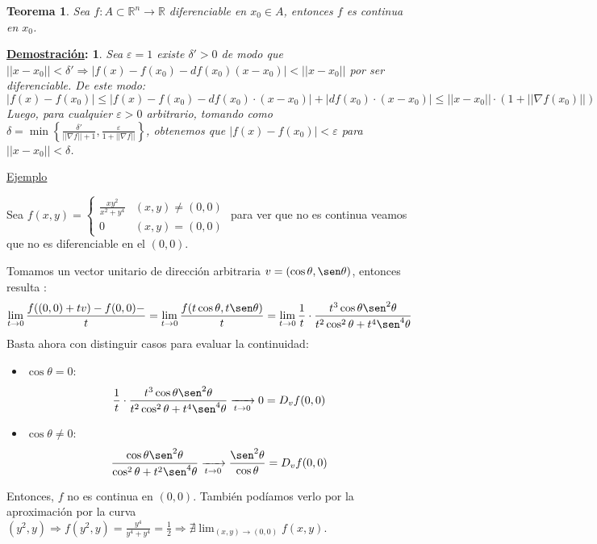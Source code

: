 \documentclass[10pt,a4paper,openright]{book}
\theoremstyle{break}
\newtheorem*{theo}{Teorema}
\newtheorem*{demo}{\underline{Demostración}:}
\begin{document}
\begin{theo}
Sea $f: A \subset \mathbb{R}^n \to \mathbb{R}$ diferenciable en $x_0 \in A$, entonces $f$ es continua en $x_0$.
\end{theo}
\begin{demo}
Sea $\varepsilon = 1$ existe $\delta' > 0$ de modo que $|| x - x_0 || < \delta' \Rightarrow |f(x) - f(x_0) - d f(x_0) (x - x_0)| < || x - x_0 ||$ por ser diferenciable. De este modo:
$$|f(x) - f(x_0)| \leq |f(x) - f(x_0) - df(x_0)\cdot (x - x_0)| + |df(x_0) \cdot (x - x_0)| \leq ||x-x_0|| \cdot (1 + || \nabla f(x_0) ||)$$
Luego, para cualquier $\varepsilon > 0$ arbitrario, tomando como $\delta = \min\left\lbrace \frac{\delta'}{||\nabla f || + 1}, \frac{\varepsilon}{1 + || \nabla f||}\right\rbrace$, obtenemos que $|f(x) - f(x_0)| < \varepsilon$ para $||x - x_0|| < \delta$.
\end{demo}

\underline{Ejemplo}

Sea $f(x,y) = \begin{cases} \frac{xy^2}{x^2 + y^4} & (x,y) \neq (0,0) \\ 0 & (x,y) = (0,0) \end{cases}$ para ver que no es continua veamos que no es diferenciable en el $(0,0)$.

Tomamos un vector unitario de dirección arbitraria $v = (\cos\theta , \sen\theta)$, entonces resulta :
$$\lim_{t\rightarrow 0}\frac{f((0,0) + tv) - f(0,0) -}{t}=\lim_{t\rightarrow 0} \frac{f(t\cos\theta, t \sen\theta)}{t} =\lim_{t\rightarrow 0} \frac{1}{t} \cdot \frac{t^3 \cos\theta \sen^2 \theta}{t^2 \cos^2 \theta + t^4 \sen^4 \theta}$$
Basta ahora con distinguir casos para evaluar la continuidad:
	\begin{itemize}
		\item $\cos\theta = 0$:
		$$\frac{1}{t} \cdot \frac{t^3 \cos\theta \sen^2 \theta}{t^2 \cos^2 \theta + t^4 \sen^4 \theta} \xrightarrow[t \to 0]{} 0 = D_v f(0,0)$$
		\item $\cos\theta \neq 0$:
		$$\frac{\cos\theta \sen^2\theta}{\cos^2 \theta + t^2 \sen^4 \theta} \xrightarrow[t \to 0]{} \frac{\sen^2 \theta}{\cos\theta} = D_v f(0,0)$$
\end{itemize}

Entonces, $f$ no es continua en $(0,0)$. También podíamos verlo por la aproximación por la curva $(y^2,y)\Rightarrow f(y^2, y) = \frac{y^4}{y^4 + y^4} = \frac{1}{2} \Rightarrow \nexists \lim_{(x,y) \to (0,0)} f(x,y)$.
\end{document}
